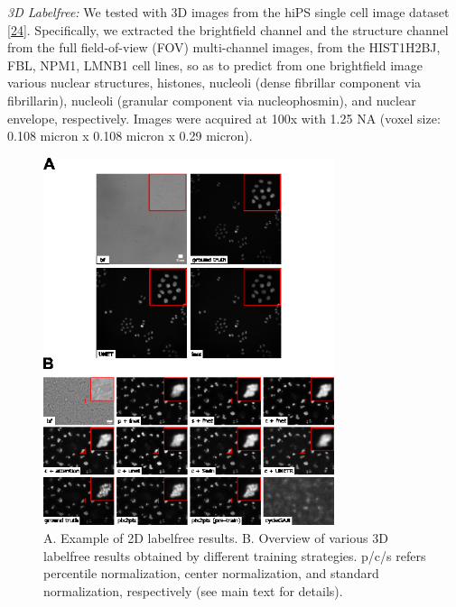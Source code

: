 \emph{3D Labelfree:} We tested with 3D images from the hiPS single cell image dataset {[}\protect\hyperlink{ref-5sGcmDuy}{24}{]}. Specifically, we extracted the brightfield channel and the structure channel from the full field-of-view (FOV) multi-channel images, from the HIST1H2BJ, FBL, NPM1, LMNB1 cell lines, so as to predict from one brightfield image various nuclear structures, histones, nucleoli (dense fibrillar component via fibrillarin), nucleoli (granular component via nucleophosmin), and nuclear envelope, respectively. Images were acquired at 100x with 1.25 NA (voxel size: 0.108 micron x 0.108 micron x 0.29 micron).

\begin{figure}
\hypertarget{fig:labelfree_comparison}{%
\centering
\includegraphics[width=0.76\textwidth,height=0.9\textheight]{images/labelfree_comparison_justin.png}
\caption{A. Example of 2D labelfree results. B. Overview of various 3D labelfree results obtained by different training strategies. p/c/s refers percentile normalization, center normalization, and standard normalization, respectively (see main text for details).}\label{fig:labelfree_comparison}
}
\end{figure}


